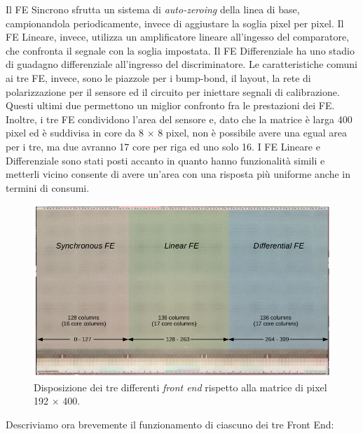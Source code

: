 Il FE Sincrono sfrutta un sistema di \textit{auto-zeroing} della linea di base, campionandola periodicamente, invece di aggiustare la soglia pixel per pixel. 
Il FE Lineare, invece, utilizza un amplificatore lineare all'ingesso del comparatore, che confronta il segnale con la soglia impostata. 
Il FE Differenziale ha uno stadio di guadagno differenziale all'ingresso del discriminatore. %
Le caratteristiche comuni ai tre FE, invece, sono le piazzole per i bump-bond, il layout, la rete di polarizzazione per il sensore ed il circuito per iniettare segnali di calibrazione.
Questi ultimi due permettono un miglior confronto fra le prestazioni dei FE.
Inoltre, i tre FE condividono l'area del sensore e, dato che la matrice è larga 400 pixel ed è suddivisa in core da 8 $\times$ 8 pixel, non è possibile avere una egual area per i tre, ma due avranno 17 core per riga ed uno solo 16.
I FE Lineare e Differenziale sono stati posti accanto in quanto hanno funzionalità simili e metterli vicino consente di avere un'area con una risposta più uniforme anche in termini di consumi. 
\begin{figure}
\centering
\includegraphics[scale=.3]{Immagini/FrontEnd}
\caption{Disposizione dei tre differenti \textit{front end} rispetto alla matrice di pixel 192 $\times$ 400.}
\label{FrontEnd}
\end{figure}

Descriviamo ora brevemente il funzionamento di ciascuno dei tre Front End:

